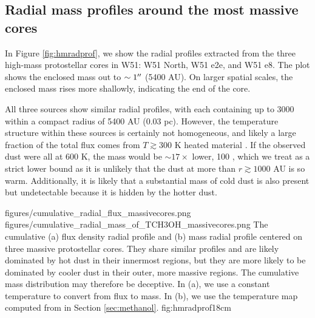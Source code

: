 \documentclass{aa}
\begin{document}
\subsection{Radial mass profiles around the most massive cores}
\label{sec:radialmass}
In Figure \ref{fig:hmradprof}, we show the radial profiles extracted from the
three high-mass protostellar cores in W51: W51 North, W51 e2e, and W51 e8.
The plot shows the enclosed mass out to $\sim1\mbox{$^{\prime\prime}$}$ (5400 AU).  On larger
spatial scales, the enclosed mass rises more shallowly, indicating the end of the
core.

All three sources show similar radial profiles, with each containing up to 3000
\msun within a compact radius of 5400 AU (0.03 pc).  However, the temperature
structure within these sources is certainly not homogeneous, and  likely a
large fraction of the total flux comes from $T\gtrsim300$ K heated material
\citep[Section \ref{sec:temperature}; ][]{Goddi2016a}.  If the observed dust
were all at 600 K, the mass would be $\sim17\times$ lower, 100 \msun, which we
treat as a strict lower bound as it is unlikely that the dust at more than
$r\gtrsim1000$ AU is so warm.  Additionally, it is  likely that a substantial
mass of cold dust is also present but undetectable because it is hidden by the
hotter dust.

\FigureTwo
{figures/cumulative_radial_flux_massivecores.png}
{figures/cumulative_radial_mass_of_TCH3OH_massivecores.png}
{The cumulative (a) flux density radial profile and (b) mass radial profile
centered on three massive protostellar cores.  They share similar profiles and
are likely dominated by hot dust in their innermost regions, but they are more
likely to be dominated by cooler dust in their outer, more massive regions.
The cumulative mass distribution may therefore be deceptive.  In (a), we use a
constant temperature to convert from flux to mass.  In (b), we use the
temperature map computed from \methanol in
Section \ref{sec:methanol}.}
{fig:hmradprof}{1}{8cm}


\end{document}
